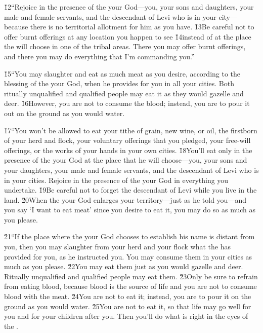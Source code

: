 \v{12}``Rejoice in the presence of the  your God---you, your sons and daughters, your male and female servants, and the descendant of Levi who is in your city---because there is no territorial allotment for him as you have. \v{13}Be careful not to offer burnt offerings at any location you happen to see \v{14}instead of at the place the  will choose in one of the tribal areas. There you may offer burnt offerings, and there you may do everything that I'm commanding you.''

\v{15}``You may slaughter and eat as much meat as you desire, according to the blessing of the  your God, when he provides for you in all your cities. Both ritually unqualified and qualified people may eat it as they would gazelle and deer. \v{16}However, you are not to consume the blood; instead, you are to pour it out on the ground as you would water.

\v{17}``You won't be allowed to eat your tithe of grain, new wine, or oil, the firstborn of your herd and flock, your voluntary offerings that you pledged, your free-will offerings, or the works of your hands in your own cities. \v{18}You'll eat only in the presence of the  your God at the place that he will choose---you, your sons and your daughters, your male and female servants, and the descendant of Levi who is in your cities. Rejoice in the presence of the  your God in everything you undertake. \v{19}Be careful not to forget the descendant of Levi while you live in the land. \v{20}When the  your God enlarges your territory---just as he told you---and you say `I want to eat meat' since you desire to eat it, you may do so as much as you please.

\v{21}``If the place where the  your God chooses to establish his name is distant from you, then you may slaughter from your herd and your flock what the  has provided for you, as he instructed you. You may consume them in your cities as much as you please. \v{22}You may eat them just as you would gazelle and deer. Ritually unqualified and qualified people may eat them. \v{23}Only be sure to refrain from eating blood, because blood is the source of life and you are not to consume blood with the meat. \v{24}You are not to eat it; instead, you are to pour it on the ground as you would water. \v{25}You are not to eat it, so that life may go well for you and for your children after you. Then you'll do what is right in the eyes of the .

